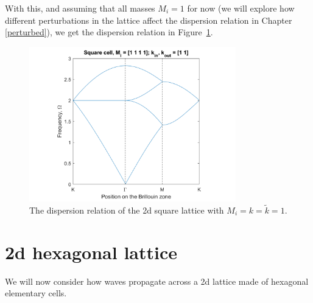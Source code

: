 With this, and assuming that all masses $M_i=1$ for now (we will explore how
different perturbations in the lattice affect the dispersion relation in
Chapter \ref{perturbed}), we get the dispersion relation in
Figure~\ref{fig:sqdisper}. 

\begin{figure}[!h]
\centering
\includegraphics[width=0.8\textwidth]{imgs/sqdisper.png}
\caption{\label{fig:sqdisper} The dispersion relation of the 2d square lattice
  with $M_i=k=\tilde{k}=1$.}
\end{figure}

\section{2d hexagonal lattice}
\label{2dhexdisper}
We will now consider how waves propagate across a 2d lattice made of hexagonal
elementary cells. 

